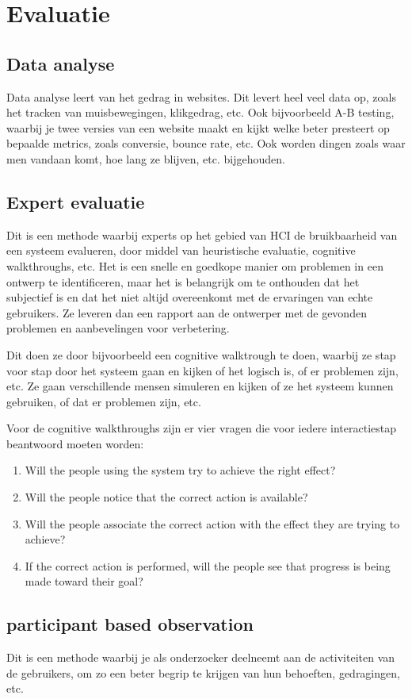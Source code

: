 \documentclass[nonacm, sigconf, balance=true]{acmart}
\begin{document}
    \section{Evaluatie}
    \subsection{Data analyse}
    Data analyse leert van het gedrag in websites.
    Dit levert heel veel data op, zoals het tracken van muisbewegingen, klikgedrag, etc.
    Ook bijvoorbeeld A-B testing, waarbij je twee versies van een website maakt en kijkt welke beter presteert op bepaalde metrics, zoals conversie, bounce rate, etc.
    Ook worden dingen zoals waar men vandaan komt, hoe lang ze blijven, etc. bijgehouden.

    \subsection{Expert evaluatie}
    Dit is een methode waarbij experts op het gebied van HCI de bruikbaarheid van een systeem evalueren, door middel van heuristische evaluatie, cognitive walkthroughs, etc.
    Het is een snelle en goedkope manier om problemen in een ontwerp te identificeren, maar het is belangrijk om te onthouden dat het subjectief is en dat het niet altijd overeenkomt met de ervaringen van echte gebruikers.
    Ze leveren dan een rapport aan de ontwerper met de gevonden problemen en aanbevelingen voor verbetering.

    Dit doen ze door bijvoorbeeld een cognitive walktrough te doen, waarbij ze stap voor stap door het systeem gaan en kijken of het logisch is, of er problemen zijn, etc.
    Ze gaan verschillende mensen simuleren en kijken of ze het systeem kunnen gebruiken, of dat er problemen zijn, etc.

    Voor de cognitive walkthroughs zijn er vier vragen die voor iedere interactiestap beantwoord moeten worden:
    \begin{enumerate}
        \item Will the people using the system try to achieve the right effect?
        \item Will the people notice that the correct action is available?
        \item Will the people associate the correct action with the effect they are trying to achieve?
        \item If the correct action is performed, will the people see that progress is being made toward their goal?
    \end{enumerate}

    \subsection{participant based observation}
    Dit is een methode waarbij je als onderzoeker deelneemt aan de activiteiten van de gebruikers, om zo een beter begrip te krijgen van hun behoeften, gedragingen, etc.
\end{document}
